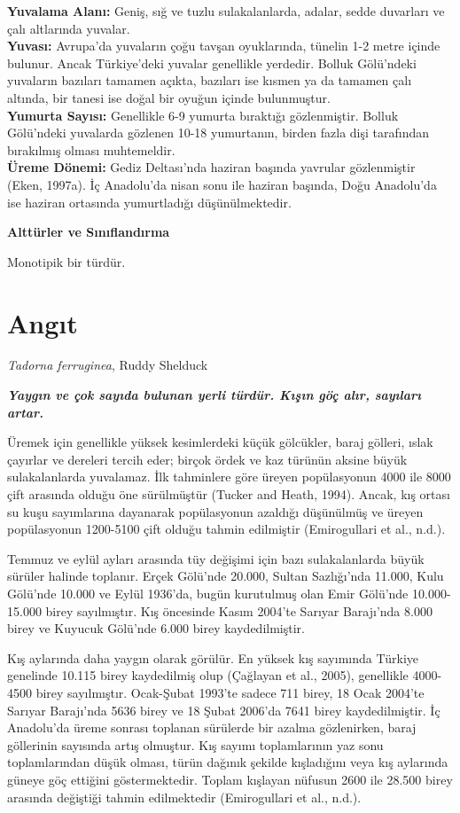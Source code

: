 \documentclass[
  a4paper,
  DIV=11,
  numbers=noendperiod]{scrartcl}
\begin{document}
\textbf{Yuvalama Alanı:} Geniş, sığ ve tuzlu sulakalanlarda, adalar,
sedde duvarları ve çalı altlarında yuvalar.\\
\textbf{Yuvası:} Avrupa'da yuvaların çoğu tavşan oyuklarında, tünelin
1-2 metre içinde bulunur. Ancak Türkiye'deki yuvalar genellikle
yerdedir. Bolluk Gölü'ndeki yuvaların bazıları tamamen açıkta, bazıları
ise kısmen ya da tamamen çalı altında, bir tanesi ise doğal bir oyuğun
içinde bulunmuştur.\\
\textbf{Yumurta Sayısı:} Genellikle 6-9 yumurta bıraktığı gözlenmiştir.
Bolluk Gölü'ndeki yuvalarda gözlenen 10-18 yumurtanın, birden fazla dişi
tarafından bırakılmış olması muhtemeldir.\\
\textbf{Üreme Dönemi:} Gediz Deltası'nda haziran başında yavrular
gözlenmiştir (Eken, 1997a). İç Anadolu'da nisan sonu ile haziran
başında, Doğu Anadolu'da ise haziran ortasında yumurtladığı
düşünülmektedir.

\textbf{Alttürler ve Sınıflandırma}

Monotipik bir türdür.

\section{Angıt}\label{angux131t}

\emph{Tadorna ferruginea}, Ruddy Shelduck

\textbf{\emph{Yaygın ve çok sayıda bulunan yerli türdür. Kışın göç alır,
sayıları artar.}}

Üremek için genellikle yüksek kesimlerdeki küçük gölcükler, baraj
gölleri, ıslak çayırlar ve dereleri tercih eder; birçok ördek ve kaz
türünün aksine büyük sulakalanlarda yuvalamaz. İlk tahminlere göre
üreyen popülasyonun 4000 ile 8000 çift arasında olduğu öne sürülmüştür
(Tucker and Heath, 1994). Ancak, kış ortası su kuşu sayımlarına
dayanarak popülasyonun azaldığı düşünülmüş ve üreyen popülasyonun
1200-5100 çift olduğu tahmin edilmiştir (Emirogullari et al., n.d.).

Temmuz ve eylül ayları arasında tüy değişimi için bazı sulakalanlarda
büyük sürüler halinde toplanır. Erçek Gölü'nde 20.000, Sultan
Sazlığı'nda 11.000, Kulu Gölü'nde 10.000 ve Eylül 1936'da, bugün
kurutulmuş olan Emir Gölü'nde 10.000-15.000 birey sayılmıştır. Kış
öncesinde Kasım 2004'te Sarıyar Barajı'nda 8.000 birey ve Kuyucuk
Gölü'nde 6.000 birey kaydedilmiştir.

Kış aylarında daha yaygın olarak görülür. En yüksek kış sayımında
Türkiye genelinde 10.115 birey kaydedilmiş olup (Çağlayan et al., 2005),
genellikle 4000-4500 birey sayılmıştır. Ocak-Şubat 1993'te sadece 711
birey, 18 Ocak 2004'te Sarıyar Barajı'nda 5636 birey ve 18 Şubat 2006'da
7641 birey kaydedilmiştir. İç Anadolu'da üreme sonrası toplanan
sürülerde bir azalma gözlenirken, baraj göllerinin sayısında artış
olmuştur. Kış sayımı toplamlarının yaz sonu toplamlarından düşük olması,
türün dağınık şekilde kışladığını veya kış aylarında güneye göç ettiğini
göstermektedir. Toplam kışlayan nüfusun 2600 ile 28.500 birey arasında
değiştiği tahmin edilmektedir (Emirogullari et al., n.d.).
\end{document}
